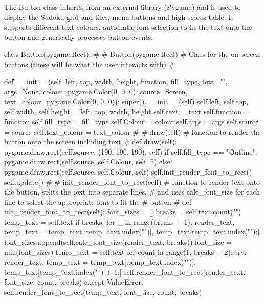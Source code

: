 \documentclass[fleqn]{article}
\begin{document}
The Button class inherits from an external library (Pygame) and is used to display the Sudoku grid and tiles, menu buttons and high scores table. It supports different text colours, automatic font selection to fit the text onto the button and generically processes button events.

\begin{python}
class Button(pygame.Rect):
#
# Button(pygame.Rect)
# Class for the on screen buttons (these will be what the user interacts with)
#

    def __init__(self, left, top, width, height, function, fill_type, text="",
                 args=None, colour=pygame.Color(0, 0, 0), source=Screen,          text_colour=pygame.Color(0, 0, 0)):
        super().__init__(self)
        self.left, self.top, self.width, self.height = left, top, width, height
        self.text = text
        self.function = function
        self.fill_type = fill_type
        self.Colour = colour
        self.args = args
        self.source = source
        self.text_colour = text_colour
#
# draw(self)
# function to render the button onto the screen including text
#
    def draw(self):
        pygame.draw.rect(self.source, (190, 190, 190), self)
        if self.fill_type == "Outline":
            pygame.draw.rect(self.source, self.Colour, self, 5)
        else:
            pygame.draw.rect(self.source, self.Colour, self)
        self.init_render_font_to_rect()
        self.update()
#
# init_render_font_to_rect(self) 
# function to render text onto the button, splits the text into separate lines, 
# and uses calc_font_size for each line to select the appropriate font to fit the 
# button
#
    def init_render_font_to_rect(self):
        font_sizes = []
        breaks = self.text.count("\n")
        temp_text = self.text
        if breaks:
            for _ in range(breaks + 1):
                render_text, temp_text = temp_text[:temp_text.index("\n")], temp_text[temp_text.index("\n"):]
                font_sizes.append(self.calc_font_size(render_text, breaks))
            font_size = min(font_sizes)
            temp_text = self.text
            for count in range(1, breaks + 2):
                try:
                    render_text, temp_text = temp_text[:temp_text.index("\n")], temp_text[temp_text.index("\n") + 1:]
                    self.render_font_to_rect(render_text, font_size, count, breaks)
                except ValueError:
                    self.render_font_to_rect(temp_text, font_size, count, breaks)


\end{python}
\end{document}
